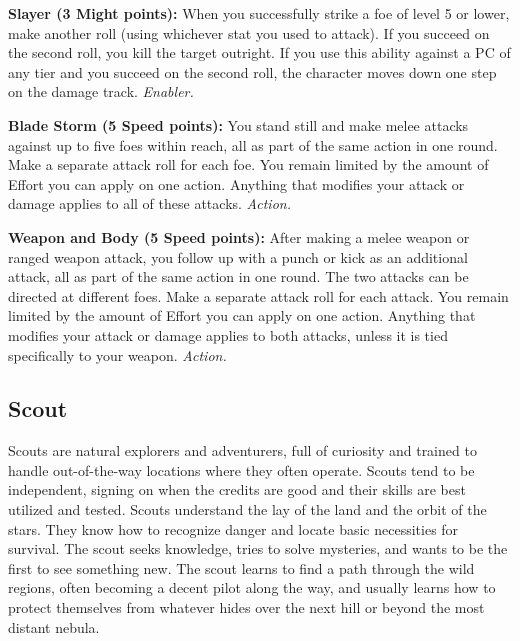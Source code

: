 \documentclass[a4paper,10pt,final,twocolumn,oneside]{book}
\newcommand{\itemAbility}[2]{\textcolor{25gray}{\textbullet\textbf{ #1:}}{ #2}\par}
\newcommand{\enabler}{\textit{ Enabler.}}
\newcommand{\action}{\textit{ Action.}}
\begin{document}
\itemAbility{Slayer (3 Might points)}{When you successfully strike a foe of level 5 or lower, make another roll (using whichever stat you used to attack). If you succeed on the second roll, you kill the target outright. If you use this ability against a PC of any tier and you succeed on the second roll, the character moves down one step on the damage track.\enabler}

\itemAbility{Blade Storm (5 Speed points)}{You stand still and make melee attacks against up to five foes within reach, all as part of the same action in one round. Make a separate attack roll for each foe. You remain limited by the amount of Effort you can apply on one action. Anything that modifies your attack or damage applies to all of these attacks.\action}

\itemAbility{Weapon and Body (5 Speed points)}{After making a melee weapon or ranged weapon attack, you follow up with a punch or kick as an additional attack, all as part of the same action in one round. The two attacks can be directed at different foes. Make a separate attack roll for each attack. You remain limited by the amount of Effort you can apply on one action. Anything that modifies your attack or damage applies to both attacks, unless it is tied specifically to your weapon.\action}

\clearpage


%
%
%
%
%
%
%
%
%
%
%
%
%
%
%
%
%
%
%


\subsection{Scout} %
\label{sub:scout}

Scouts are natural explorers and adventurers, full of curiosity and trained to handle out-of-the-way locations where they often operate. Scouts tend to be independent, signing on when the credits are good and their skills are best utilized and tested. Scouts understand the lay of the land and the orbit of the stars. They know how to recognize danger and locate basic necessities for survival. The scout seeks knowledge, tries to solve mysteries, and wants to be the first to see something new. The scout learns to find a path through the wild regions, often becoming a decent pilot along the way, and usually learns how to protect themselves from whatever hides over the next hill or beyond the most distant nebula.
\end{document}
